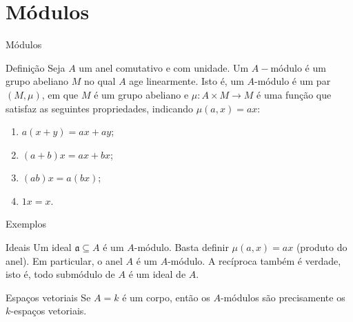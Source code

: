 \documentclass[aspectratio=169]{beamer}
\begin{document}
\section{Módulos}

\begin{frame}{Módulos}
	\begin{block}{Definição}
		Seja $A$ um anel comutativo e com unidade.
		Um $A-$módulo é um grupo abeliano $M$ no qual $A$ age linearmente.
		Isto é, um $A$-módulo é um par $(M, \mu)$, em que $M$ é um grupo abeliano e $\mu:A \times M \to M$ é uma função que satisfaz as seguintes propriedades, indicando $\mu(a, x) = ax$:
		\begin{enumerate}
			\item $a(x+y) = ax + ay$;
			\item $(a+b)x = ax + bx$;
			\item $(ab)x = a(bx)$;
			\item $1x = x$.
		\end{enumerate}
	\end{block}
\end{frame}

\begin{frame}{Exemplos}
	\begin{block}{Ideais}
		Um ideal $\mathfrak{a}\subseteq A$ é um $A$-módulo. Basta definir $\mu(a,x) = ax$ (produto do anel). Em particular, o anel $A$ é um $A$-módulo. A recíproca também é verdade, isto é, todo submódulo de $A$ é um ideal de $A$.
	\end{block}
	\begin{block}{Espaços vetoriais}
		Se $A=k$ é um corpo, então os $A$-módulos são precisamente os $k$-espaços vetoriais.
	\end{block}
\end{frame}

\end{document}
